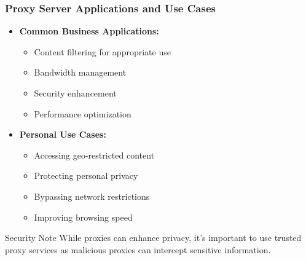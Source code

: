 \documentclass{beamer}
\begin{document}
\begin{frame}
    \frametitle{Proxy Server Applications and Use Cases}
    
    \begin{itemize}
        \item \textbf{Common Business Applications:}
        \begin{itemize}
            \item Content filtering for appropriate use
            \item Bandwidth management
            \item Security enhancement
            \item Performance optimization
        \end{itemize}
        
        \item \textbf{Personal Use Cases:}
        \begin{itemize}
            \item Accessing geo-restricted content
            \item Protecting personal privacy
            \item Bypassing network restrictions
            \item Improving browsing speed
        \end{itemize}
    \end{itemize}
    
    \begin{alertblock}{Security Note}
        While proxies can enhance privacy, it's important to use trusted proxy services as malicious proxies can intercept sensitive information.
    \end{alertblock}
\end{frame}
\end{document}
